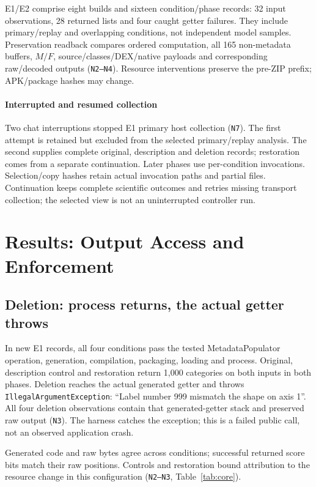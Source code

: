 \documentclass[10pt,conference]{IEEEtran}
\newcommand{\code}[1]{\texttt{#1}}
\begin{document}
E1/E2 comprise eight builds and sixteen condition/phase records: 32 input observations, 28 returned lists and four caught getter failures. They include primary/replay and overlapping conditions, not independent model samples. Preservation readback compares ordered computation, all 165 non-metadata buffers, $M/F$, source/classes/DEX/native payloads and corresponding raw/decoded outputs (\code{N2--N4}). Resource interventions preserve the pre-ZIP prefix; APK/package hashes may change.

\paragraph{Interrupted and resumed collection}
Two chat interruptions stopped E1 primary host collection (\code{N7}). The first attempt is retained but excluded from the selected primary/replay analysis. The second supplies complete original, description and deletion records; restoration comes from a separate continuation. Later phases use per-condition invocations. Selection/copy hashes retain actual invocation paths and partial files. Continuation keeps complete scientific outcomes and retries missing transport collection; the selected view is not an uninterrupted controller run.

\section{Results: Output Access and Enforcement}
\label{sec:results}
\subsection{Deletion: process returns, the actual getter throws}
\label{sec:e1}
In new E1 records, all four conditions pass the tested MetadataPopulator operation, generation, compilation, packaging, loading and process. Original, description control and restoration return 1,000 categories on both inputs in both phases. Deletion reaches the actual generated getter and throws \code{IllegalArgumentException}: ``Label number 999 mismatch the shape on axis 1''. All four deletion observations contain that generated-getter stack and preserved raw output (\code{N3}). The harness catches the exception; this is a failed public call, not an observed application crash.

Generated code and raw bytes agree across conditions; successful returned score bits match their raw positions. Controls and restoration bound attribution to the resource change in this configuration (\code{N2--N3}, Table~\ref{tab:core}).
\end{document}
